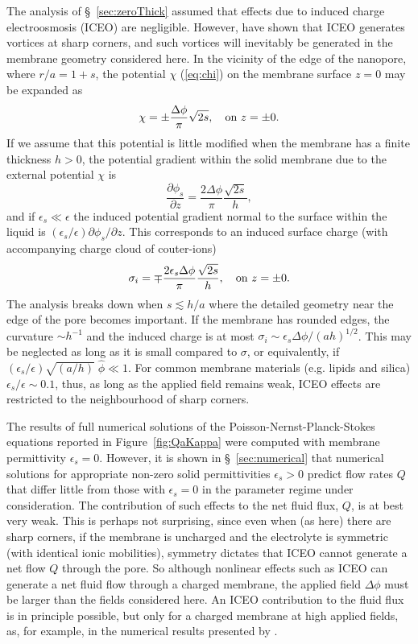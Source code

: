 The analysis of \S~\ref{sec:zeroThick} assumed that effects due to induced charge electroosmosis (ICEO) are negligible. However, \cite{Thamida2002} have shown that ICEO generates vortices at sharp corners, and such
vortices will inevitably be generated in the membrane geometry considered here. In the vicinity of the edge of the nanopore, where $r/a=1+s$, the potential $\chi$ (\ref{eq:chi}) on the membrane surface
$z=0$ may be expanded as
\begin{equation}
\chi=\pm\frac{\Delta\phi}{\pi}\sqrt{2s},\quad \hbox{on $z=\pm0$.}
\end{equation}
If we assume that this potential is little modified when the membrane has a finite thickness $h>0$, the potential gradient within the solid membrane due to the external potential $\chi$ is
\begin{equation}
\frac{\partial\phi_s}{\partial z}=\frac{2\Delta\phi}{\pi}\frac{\sqrt{2s}}{h},
\end{equation}
and if $\epsilon_s\ll\epsilon$ the induced potential gradient normal to the surface within the liquid is 
$(\epsilon_s/\epsilon)\partial\phi_s/\partial z$. This corresponds to an induced surface charge (with accompanying charge cloud of couter-ions)
\begin{equation}
\sigma_i=\mp\frac{2\epsilon_s\Delta\phi}{\pi}\frac{\sqrt{2s}}{h}
,\quad \hbox{on $z=\pm0$.}
\label{induced_charge}
\end{equation}
The analysis breaks down when $s \lesssim h/a$ where the detailed geometry near the edge of the pore becomes important. If the membrane has rounded edges, the curvature $\sim h^{-1}$ and the induced charge is at most $\sigma_{i} \sim \epsilon_s\Delta\phi/(ah)^{1/2}$. This may be neglected as long as it is small compared to $\sigma$, or equivalently, if $(\epsilon_s/\epsilon) \sqrt{(a/h)} \; \hat{\phi} \ll 1$.
For common membrane materials (e.g. lipids and silica) $\epsilon_s / \epsilon \sim 0.1$, thus, 
as long as the applied field remains weak, ICEO effects are restricted to the neighbourhood of
sharp corners.

The results of full numerical solutions of the Poisson-Nernst-Planck-Stokes equations reported in Figure~\ref{fig:QaKappa} were computed with membrane permittivity $\epsilon_s=0$.
However, it is shown in \S~\ref{sec:numerical} that numerical solutions for appropriate non-zero solid permittivities $\epsilon_s >0$ predict flow rates $Q$ that differ little from those with $\epsilon_s=0$
in the parameter regime under consideration. The contribution of such effects to the net fluid flux, $Q$,
is at best very weak. This is perhaps not surprising, since even when (as here) there are sharp corners, if the membrane is uncharged and the electrolyte is symmetric (with identical ionic mobilities),
symmetry dictates that ICEO cannot generate a net flow $Q$ through the pore. So although nonlinear
effects such as ICEO can generate a net fluid flow through a charged membrane, the applied field $\Delta\phi$ must be larger than the fields considered here. An ICEO contribution to the fluid flux is in principle possible, but only for a charged membrane at high applied fields, as, for example, in the numerical results presented by \cite{Mao2013}.

